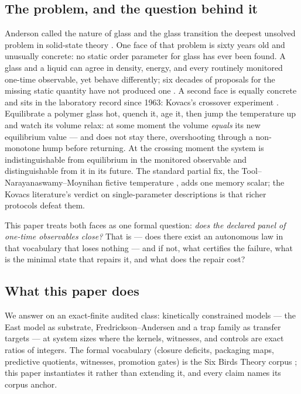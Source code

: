 \documentclass[11pt]{article}
\newcommand{\sbtcite}[1]{\cite{#1}}
\theoremstyle{definition}
\begin{document}
\subsection{The problem, and the question behind it}

Anderson called the nature of glass and the glass transition the deepest unsolved problem in
solid-state theory \cite{anderson-1995}. One face of that problem is sixty years old and
unusually concrete: no static order parameter for glass has ever been found. A glass and a liquid
can agree in density, energy, and every routinely monitored one-time observable, yet behave
differently; six decades of proposals for the missing static quantity have not produced one
\cite{berthier-biroli-2011}. A second face is equally concrete and sits in the laboratory record
since 1963: Kovacs's crossover experiment \cite{kovacs-1963}. Equilibrate a polymer glass hot,
quench it, age it, then jump the temperature up and watch its volume relax: at some moment the
volume \emph{equals} its new equilibrium value --- and does not stay there, overshooting through a
non-monotone hump before returning. At the crossing moment the system is indistinguishable from
equilibrium in the monitored observable and distinguishable from it in its future. The standard
partial fix, the Tool--Narayanaswamy--Moynihan fictive temperature
\cite{tool-1946,narayanaswamy-1971,moynihan-1976}, adds one memory scalar; the Kovacs literature's
verdict on single-parameter descriptions is that richer protocols defeat them.

This paper treats both faces as one formal question: \emph{does the declared panel of one-time
observables close?} That is --- does there exist an autonomous law in that vocabulary that loses
nothing --- and if not, what certifies the failure, what is the minimal state that repairs it, and
what does the repair cost?

\subsection{What this paper does}

We answer on an exact-finite audited class: kinetically constrained models
\cite{ritort-sollich-2003,garrahan-sollich-toninelli-2011} --- the East model
\cite{jackle-eisinger-1991} as substrate, Fredrickson--Andersen \cite{fredrickson-andersen-1984}
and a trap family \cite{bouchaud-1992,monthus-bouchaud-1996} as transfer targets --- at system
sizes where the kernels, witnesses, and controls are exact ratios of integers. The formal vocabulary (closure
deficits, packaging maps, predictive quotients, witnesses, promotion gates) is the Six Birds
Theory corpus \sbtcite{sbt-primer,sbt-foundations-i,sbt-foundations-ii,sbt-foundations-iii,sbt-foundations-iv,sbt-paper-a,sbt-paper-b,sbt-paper-c}; this paper instantiates it rather than
extending it, and every claim names its corpus anchor.
\end{document}
